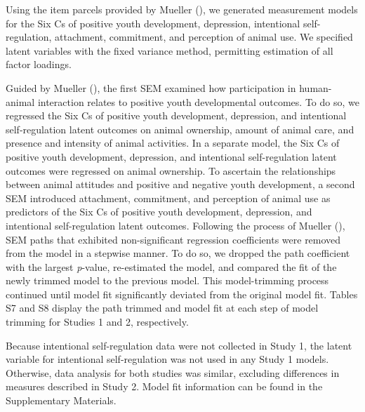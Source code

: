 \documentclass[
  jou,
  longtable,
  nolmodern,
  notxfonts,
  notimes,
  colorlinks=true,linkcolor=blue,citecolor=blue,urlcolor=blue]{apa7}
\begin{document}
Using the item parcels provided by Mueller
(), we generated measurement models for
the Six Cs of positive youth development, depression, intentional
self-regulation, attachment, commitment, and perception of animal use.
We specified latent variables with the fixed variance method, permitting
estimation of all factor loadings.

Guided by Mueller (), the first SEM
examined how participation in human-animal interaction relates to
positive youth developmental outcomes. To do so, we regressed the Six Cs
of positive youth development, depression, and intentional
self-regulation latent outcomes on animal ownership, amount of animal
care, and presence and intensity of animal activities. In a separate
model, the Six Cs of positive youth development, depression, and
intentional self-regulation latent outcomes were regressed on animal
ownership. To ascertain the relationships between animal attitudes and
positive and negative youth development, a second SEM introduced
attachment, commitment, and perception of animal use as predictors of
the Six Cs of positive youth development, depression, and intentional
self-regulation latent outcomes. Following the process of Mueller
(), SEM paths that exhibited
non-significant regression coefficients were removed from the model in a
stepwise manner. To do so, we dropped the path coefficient with the
largest \emph{p}-value, re-estimated the model, and compared the fit of
the newly trimmed model to the previous model. This model-trimming
process continued until model fit significantly deviated from the
original model fit. Tables S7 and S8 display the path trimmed and model
fit at each step of model trimming for Studies 1 and 2, respectively.

Because intentional self-regulation data were not collected in Study 1,
the latent variable for intentional self-regulation was not used in any
Study 1 models. Otherwise, data analysis for both studies was similar,
excluding differences in measures described in Study 2. Model fit
information can be found in the Supplementary Materials.
\end{document}
